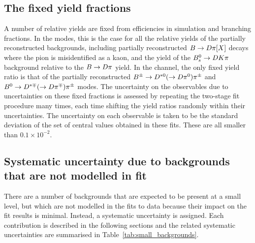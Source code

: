 \subsection{The fixed yield fractions} %
\label{sub:the_bs_yield}

A number of relative yields are fixed from efficiencies in simulation and branching fractions. In the \DK modes, this is the case for all the relative yields of the partially reconstructed backgrounds, including partially reconstructed ${B}\rightarrow{\ensuremath{D}}\pi[X]$ decays where the pion is misidentified as a kaon, and the yield of the ${{B}^0_{s}}\rightarrow{\ensuremath{D}}{\ensuremath{K}}\pi$ background relative to the ${B}\rightarrow{\ensuremath{D}}\pi$ yield. In the \BtoDpi channel, the only fixed yield ratio is that of the partially reconstructed ${{B}^\pm}\rightarrow{\ensuremath{{D}^{*0}}}(\rightarrow{\ensuremath{D}}{\ensuremath{{\pi}^0}}){{\pi}^\pm}$ and ${{B}^0}\rightarrow{\ensuremath{{D}^{*\mp}}}(\rightarrow{\ensuremath{D}}{\ensuremath{{\pi}^\mp}}){{\pi}^\pm}$ modes. The uncertainty on the observables due to uncertainties on these fixed fractions is assessed by repeating the two-stage fit procedure many times, each time shifting the yield ratios randomly within their uncertainties. The uncertainty on each observable is taken to be the standard deviation of the set of central values obtained in these fits. These are all smaller than $0.1\times 10^{-2}$.


\subsection{Systematic uncertainty due to backgrounds that are not modelled in fit} %
\label{sub:systematic_uncertainty_due_to_backgrounds_that_are_not_modelled_in_fit}

There are a number of backgrounds that are expected to be present at a small level, but which are not modelled in the fits to data because their impact on the fit results is minimal. Instead, a systematic uncertainty is assigned. Each contribution is described in the following sections and the related systematic uncertainties are summarised in Table~\ref{tab:small_backgrounds}.

